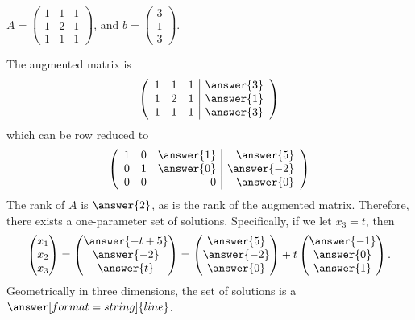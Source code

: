 \documentclass{ximera}
\begin{document}
\begin{exercise}
\item $A = \begin{pmatrix}1 & 1 & 1\\ 1 & 2 & 1 \\ 1 & 1 & 1\end{pmatrix}$, 
and $b = \begin{pmatrix}3 \\ 1 \\ 3\end{pmatrix}$.  


\begin{multipleChoice}
\end{multipleChoice}

\begin{problem}
\soln
The augmented matrix is 
\[
\left(\begin{array}{rrr|r} 
  1 & 1 & 1 & \answer{3} \\ 
  1 & 2 & 1 & \answer{1} \\
  1 & 1 & 1 & \answer{3} \end{array} \right)
  \]
which can be row reduced to
\[
\left(\begin{array}{rrr|r} 
  1 & 0 & \answer{1} & \answer{5} \\ 
  0 & 1 & \answer{0} & \answer{-2} \\
  0 & 0 & 0 & \answer{0} \end{array} \right)
  \]
The rank of $A$ is $\answer{2}$, as is the rank of the augmented matrix.  Therefore, there exists a one-parameter set of solutions.  Specifically, if we let $x_3=t$, then 
\[
\begin{pmatrix}x_1 \\ x_2 \\ x_3\end{pmatrix} =
\begin{pmatrix}\answer{-t+5} \\ \answer{-2} \\ \answer{t}\end{pmatrix} =
\begin{pmatrix}\answer{5} \\ \answer{-2} \\ \answer{0}\end{pmatrix} + t\begin{pmatrix} \answer{-1} \\ \answer{0} \\ \answer{1}\end{pmatrix}. 
\]
Geometrically in three dimensions, the set of solutions is a $\answer[format=string]{line}$.   
\end{problem}
\end{exercise}
\end{document}

